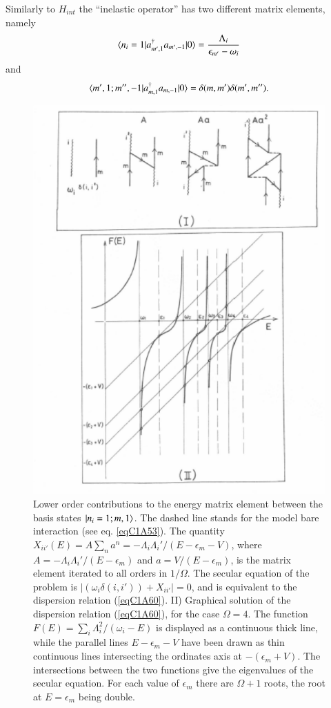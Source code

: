 Similarly to $H_{int}$ the ``inelastic operator'' has two different matrix elements, namely 
 \begin{align}\label{eqC1A54} 
 \langle {n_i=1|a^\dagger_{m',1}a_{m',-1}|0} \rangle=\frac{\Lambda_i}{\epsilon_{m'}-\omega_i}
 \end{align} 
 and
  \begin{align}\label{eqC1A55} 
 \langle {m',1;m'',-1|a^\dagger_{m,1}a_{m,-1}|0} \rangle=\delta(m,m')\delta(m',m'').
  \end{align} 
    \begin{figure}
    \centerline {
    \includegraphics*[width=12cm]{introduccion/figs/fig21}
    }
    \caption{Lower order contributions to the energy matrix element between the basis states $|{n_i=1;m,1} \rangle$. The dashed line stands for the model bare interaction (see eq. \ref{eqC1A53}). The quantity $X_{ii'}(E)=A\sum_na^n=-\Lambda_i\Lambda_i'/(E-\epsilon_m-V)$, where $A=-\Lambda_i\Lambda_i'/(E-\epsilon_m)$ and $a=V/(E-\epsilon_m)$, is the matrix element iterated to all orders in $1/\Omega$. The secular equation of the problem is $|(\omega_i\delta(i,i'))+X_{ii'}|=0$, and is equivalent to the dispersion relation (\ref{eqC1A60}). II) Graphical solution of the dispersion relation (\ref{eqC1A60}), for the case $\Omega=4$. The function $F(E)=\sum_i\Lambda_i^2/(\omega_i-E)$ is displayed as a continuous thick line, while the parallel lines $E-\epsilon_m-V$ have been drawn as thin continuous lines intersecting the ordinates axis at $-(\epsilon_m+V)$. The intersections between the two functions give the eigenvalues of the secular equation. For each value of $\epsilon_m$ there are $\Omega+1$ roots, the root at $E=\epsilon_m$ being double.}
    \label{figC1A4}
    \end{figure}
